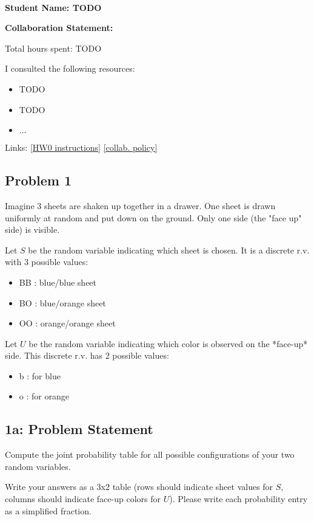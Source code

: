 \documentclass[10pt]{article}
\newcommand{\officialdirections}[1]{{\color{purple} #1}}
\begin{document}
~~\\ %

{\Large{\bf Student Name: TODO}}

\Large{\bf Collaboration Statement:}

Total hours spent: TODO

I consulted the following resources:
\begin{itemize}
\item TODO
\item TODO
\item $\ldots$	
\end{itemize}

Links: 
\href{https://www.cs.tufts.edu/cs/136/2024s/hw0.html}{[HW0 instructions]} 
\href{https://www.cs.tufts.edu/cs/136/2024s/index.html#collaboration}{[collab. policy]} 

\tableofcontents

\newpage
\officialdirections{
\subsection*{Problem 1}
Imagine 3 sheets are shaken up together in a drawer. One sheet is drawn uniformly at random and put down on the ground. Only one side (the "face up" side) is visible.

Let $S$ be the random variable indicating which sheet is chosen. It is a discrete r.v. with 3 possible values:

\begin{itemize}
    \item BB : blue/blue sheet
    \item BO : blue/orange sheet
    \item OO : orange/orange sheet
\end{itemize}

Let $U$ be the random variable indicating which color is observed on the *face-up* side. This discrete r.v. has 2 possible values:

\begin{itemize}
    \item b : for blue
    \item o : for orange
\end{itemize}

}

\officialdirections{
\subsection*{1a: Problem Statement}
Compute the joint probability table for all possible configurations of your two random variables.

Write your answers as a 3x2 table (rows should indicate sheet values for $S$, columns should indicate face-up colors for $U$). Please write each probability entry as a simplified fraction.
}
\end{document}
